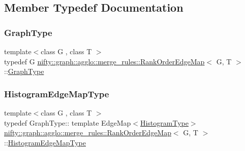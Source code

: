 \subsection{Member Typedef Documentation}
\mbox{\label{classnifty_1_1graph_1_1agglo_1_1merge__rules_1_1RankOrderEdgeMap_af6ef0c41c3cbeb666e040e06ebcda4c6}} 
\subsubsection{\texorpdfstring{Graph\+Type}{GraphType}}
{\footnotesize\ttfamily template$<$class G , class T $>$ \\
typedef G \hyperlink{classnifty_1_1graph_1_1agglo_1_1merge__rules_1_1RankOrderEdgeMap}{nifty\+::graph\+::agglo\+::merge\+\_\+rules\+::\+Rank\+Order\+Edge\+Map}$<$ G, T $>$\+::\hyperlink{classnifty_1_1graph_1_1agglo_1_1merge__rules_1_1RankOrderEdgeMap_af6ef0c41c3cbeb666e040e06ebcda4c6}{Graph\+Type}}

\mbox{\label{classnifty_1_1graph_1_1agglo_1_1merge__rules_1_1RankOrderEdgeMap_ac1bbf5aac0730dfa1d721a7f0d046f99}} 
\subsubsection{\texorpdfstring{Histogram\+Edge\+Map\+Type}{HistogramEdgeMapType}}
{\footnotesize\ttfamily template$<$class G , class T $>$ \\
typedef Graph\+Type\+:: template Edge\+Map$<$\hyperlink{classnifty_1_1graph_1_1agglo_1_1merge__rules_1_1RankOrderEdgeMap_a83f4d4fcda328512f9d91989e84a655a}{Histogram\+Type}$>$ \hyperlink{classnifty_1_1graph_1_1agglo_1_1merge__rules_1_1RankOrderEdgeMap}{nifty\+::graph\+::agglo\+::merge\+\_\+rules\+::\+Rank\+Order\+Edge\+Map}$<$ G, T $>$\+::\hyperlink{classnifty_1_1graph_1_1agglo_1_1merge__rules_1_1RankOrderEdgeMap_ac1bbf5aac0730dfa1d721a7f0d046f99}{Histogram\+Edge\+Map\+Type}}

